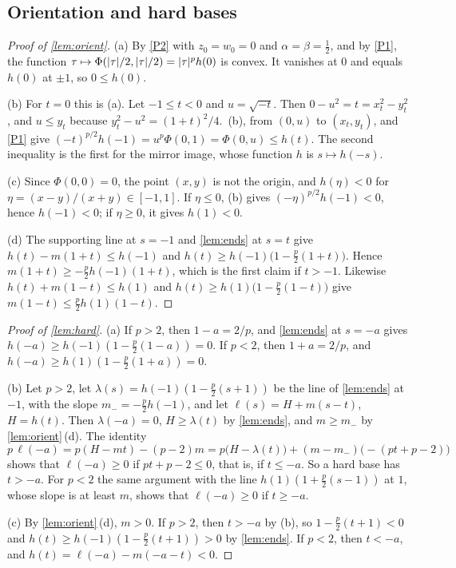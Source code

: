 \subsection{Orientation and hard bases}

\begin{proof}[Proof of \cref{lem:orient}]
(a) By \ref{P2} with $z_0=w_0=0$ and $\alpha=\beta=\tfrac12$, and by \ref{P1}, the function
$\tau\mapsto\Phi(\lvert \tau\rvert/2,\lvert \tau\rvert/2)=\lvert \tau\rvert^ph(0)$ is convex. It vanishes at $0$ and equals
$h(0)$ at $\pm1$, so $0\le h(0)$.

(b) For $t=0$ this is (a). Let $-1\le t<0$ and $u=\sqrt{-t}$. Then $0-u^2=t=x_t^2-y_t^2$, and
$u\le y_t$ because $y_t^2-u^2=(1+t)^2/4$. \,(b), from $(0,u)$ to $(x_t,y_t)$,
and \ref{P1} give $(-t)^{p/2}h(-1)=u^p\Phi(0,1)=\Phi(0,u)\le h(t)$. The second inequality is the
first for the mirror image, whose function $h$ is $s\mapsto h(-s)$.

(c) Since $\Phi(0,0)=0$, the point $(x,y)$ is not the origin, and $h(\eta)<0$ for
$\eta=(x-y)/(x+y)\in[-1,1]$. If $\eta\le0$, (b) gives $(-\eta)^{p/2}h(-1)<0$, hence
$h(-1)<0$; if $\eta\ge0$, it gives $h(1)<0$.

(d) The supporting line at $s=-1$ and \cref{lem:ends} at $s=t$ give $h(t)-m(1+t)\le h(-1)$ and
$h(t)\ge h(-1)\bigl(1-\tfrac p2(1+t)\bigr)$. Hence $m(1+t)\ge-\tfrac p2h(-1)(1+t)$, which is the
first claim if $t>-1$. Likewise $h(t)+m(1-t)\le h(1)$ and
$h(t)\ge h(1)\bigl(1-\tfrac p2(1-t)\bigr)$ give $m(1-t)\le\tfrac p2h(1)(1-t)$.
\end{proof}

\begin{proof}[Proof of \cref{lem:hard}]
(a) If $p>2$, then $1-a=2/p$, and \cref{lem:ends} at $s=-a$ gives
$h(-a)\ge h(-1)(1-\tfrac p2(1-a))=0$. If $p<2$, then $1+a=2/p$, and
$h(-a)\ge h(1)(1-\tfrac p2(1+a))=0$.

(b) Let $p>2$, let $\lambda(s)=h(-1)(1-\tfrac p2(s+1))$ be the line of \cref{lem:ends} at $-1$,
with the slope $m_-=-\tfrac p2h(-1)$, and let $\ell(s)=H+m(s-t)$, $H=h(t)$. Then
$\lambda(-a)=0$, $H\ge\lambda(t)$ by \cref{lem:ends}, and $m\ge m_-$ by \cref{lem:orient}\,(d).
The identity
\[
  p\,\ell(-a)=p(H-mt)-(p-2)m=p\bigl(H-\lambda(t)\bigr)+(m-m_-)\bigl(-(pt+p-2)\bigr)
\]
shows that $\ell(-a)\ge0$ if $pt+p-2\le0$, that is, if $t\le-a$. So a hard base has $t>-a$. For
$p<2$ the same argument with the line $h(1)(1+\tfrac p2(s-1))$ at $1$, whose slope is at least
$m$, shows that $\ell(-a)\ge0$ if $t\ge-a$.

(c) By \cref{lem:orient}\,(d), $m>0$. If $p>2$, then $t>-a$ by (b), so
$1-\tfrac p2(t+1)<0$ and $h(t)\ge h(-1)(1-\tfrac p2(t+1))>0$ by \cref{lem:ends}. If $p<2$, then
$t<-a$, and $h(t)=\ell(-a)-m(-a-t)<0$.
\end{proof}

